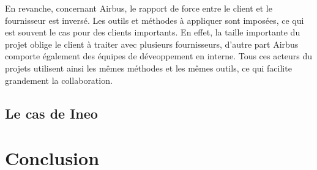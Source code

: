 En revanche, concernant Airbus, le rapport de force entre le client et le fournisseur est inversé. Les outils et méthodes à appliquer sont imposées, ce qui est souvent le cas pour des clients importants. En effet, la taille importante du projet oblige le client à traiter avec plusieurs fournisseurs, d'autre part Airbus comporte également des équipes de déveoppement en interne. Tous ces acteurs du projets utilisent ainsi les mêmes méthodes et les mêmes outils, ce qui facilite grandement la collaboration.

\subsection{Le cas de Ineo}



\section{Conclusion}
